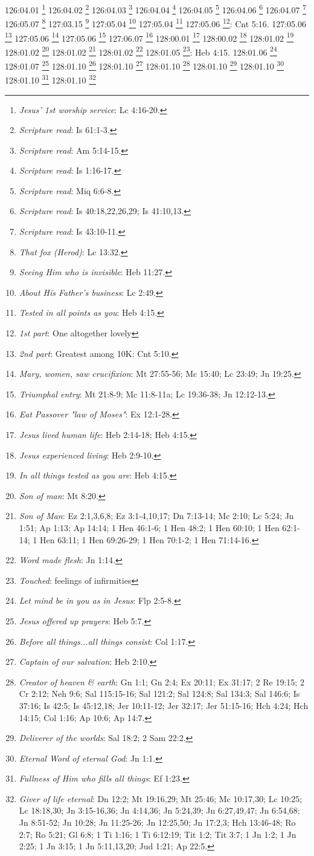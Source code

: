 {{{{{{{{{{{{{{126:04.01 \footnote{\textit{Jesus' 1st worship service}: Lc 4:16-20.}
126:04.02 \footnote{\textit{Scripture read}: Is 61:1-3.}
126:04.03 \footnote{\textit{Scripture read}: Am 5:14-15.}
126:04.04 \footnote{\textit{Scripture read}: Is 1:16-17.}
126:04.05 \footnote{\textit{Scripture read}: Miq 6:6-8.}
126:04.06 \footnote{\textit{Scripture read}: Is 40:18,22,26,29; Is 41:10,13.}
126:04.07 \footnote{\textit{Scripture read}: Is 43:10-11.}
126:05.07 \footnote{\textit{That fox (Herod)}: Lc 13:32.}
127:03.15 \footnote{\textit{Seeing Him who is invisible}: Heb 11:27.}
127:05.04 \footnote{\textit{About His Father's business}: Lc 2:49.}
127:05.04 \footnote{\textit{Tested in all points as you}: Heb 4:15.}
127:05.06 \footnote{\textit{1st part}: One altogether lovely}: Cnt 5:16.}
127:05.06 \footnote{\textit{2nd part}: Greatest among 10K: Cnt 5:10.}
127:05.06 \footnote{\textit{Mary, women, saw crucifixion}: Mt 27:55-56; Mc 15:40; Lc 23:49; Jn 19:25.}
127:05.06 \footnote{\textit{Triumphal entry}: Mt 21:8-9; Mc 11:8-11a; Lc 19:36-38; Jn 12:12-13.}
127:06.07 \footnote{\textit{Eat Passover "law of Moses"}: Ex 12:1-28.}
128:00.01 \footnote{\textit{Jesus lived human life}: Heb 2:14-18; Heb 4:15.}
128:00.02 \footnote{\textit{Jesus experienced living}: Heb 2:9-10.}
128:01.02 \footnote{\textit{In all things tested as you are}: Heb 4:15.}
128:01.02 \footnote{\textit{Son of man}: Mt 8:20.}
128:01.02 \footnote{\textit{Son of Man}: Ez 2:1,3,6,8; Ez 3:1-4,10,17; Dn 7:13-14; Mc 2:10; Lc 5:24; Jn 1:51; Ap 1:13; Ap 14:14; 1 Hen 46:1-6; 1 Hen 48:2; 1 Hen 60:10; 1 Hen 62:1-14; 1 Hen 63:11; 1 Hen 69:26-29; 1 Hen 70:1-2; 1 Hen 71:14-16.}
128:01.02 \footnote{\textit{Word made flesh}: Jn 1:14.}
128:01.05 \footnote{\textit{Touched}: feelings of infirmities}: Heb 4:15.}
128:01.06 \footnote{\textit{Let mind be in you as in Jesus}: Flp 2:5-8.}
128:01.07 \footnote{\textit{Jesus offered up prayers}: Heb 5:7.}
128:01.10 \footnote{\textit{Before all things...all things consist}: Col 1:17.}
128:01.10 \footnote{\textit{Captain of our salvation}: Heb 2:10.}
128:01.10 \footnote{\textit{Creator of heaven & earth}: Gn 1:1; Gn 2:4; Ex 20:11; Ex 31:17; 2 Re 19:15; 2 Cr 2:12; Neh 9:6; Sal 115:15-16; Sal 121:2; Sal 124:8; Sal 134:3; Sal 146:6; Is 37:16; Is 42:5; Is 45:12,18; Jer 10:11-12; Jer 32:17; Jer 51:15-16; Hch 4:24; Hch 14:15; Col 1:16; Ap 10:6; Ap 14:7.}
128:01.10 \footnote{\textit{Deliverer of the worlds}: Sal 18:2; 2 Sam 22:2.}
128:01.10 \footnote{\textit{Eternal Word of eternal God}: Jn 1:1.}
128:01.10 \footnote{\textit{Fullness of Him who fills all things}: Ef 1:23.}
128:01.10 \footnote{\textit{Giver of life eternal}: Dn 12:2; Mt 19:16,29; Mt 25:46; Mc 10:17,30; Lc 10:25; Lc 18:18,30; Jn 3:15-16,36; Jn 4:14,36; Jn 5:24,39; Jn 6:27,49,47; Jn 6:54,68; Jn 8:51-52; Jn 10:28; Jn 11:25-26; Jn 12:25,50; Jn 17:2,3; Hch 13:46-48; Ro 2:7; Ro 5:21; Gl 6:8; 1 Ti 1:16; 1 Ti 6:12:19; Tit 1:2; Tit 3:7; 1 Jn 1:2; 1 Jn 2:25; 1 Jn 3:15; 1 Jn 5:11,13,20; Jud 1:21; Ap 22:5.}
}}}}}}}}}}}}
